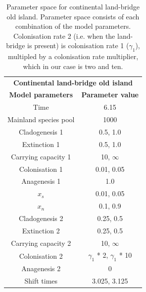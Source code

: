 \begin{table}[ht]
    \centering
    \caption{Parameter space for continental land-bridge old island. Parameter space consists of each combination of the model parameters. Colonisation rate 2 (i.e. when the land-bridge is present) is colonisation rate 1 ($\gamma_1$), multipled by a colonisation rate multiplier, which in our case is two and ten.}
    \begin{tabular}{ c | c }
        \multicolumn{2}{c}{\textbf{Continental land-bridge old island}} \\
        \textbf{Model parameters} & \textbf{Parameter value} \\ 
        \hline
        \hline
        Time & 6.15 \\
        \hline
        Mainland species pool & 1000 \\
        \hline
        Cladogenesis 1 & 0.5, 1.0 \\
        \hline
        Extinction 1 & 0.5, 1.0 \\
        \hline
        Carrying capacity 1 & 10, $\infty$ \\
        \hline
        Colonisation 1 & 0.01, 0.05 \\
        \hline
        Anagenesis 1 & 1.0 \\
        \hline
        $x_s$ & 0.01, 0.05 \\
        \hline
        $x_n$ & 0.1, 0.9 \\
        \hline
        Cladogenesis 2 & 0.25, 0.5 \\
        \hline
        Extinction 2 & 0.25, 0.5 \\
        \hline
        Carrying capacity 2 & 10, $\infty$ \\
        \hline
        Colonisation 2 & $\gamma_1$ * 2, $\gamma_1$ * 10 \\ 
        \hline 
        Anagenesis 2 & 0 \\
        \hline
        Shift times & 3.025, 3.125 \\
    \end{tabular}
    \label{tab:continental_lb_old}
\end{table}

